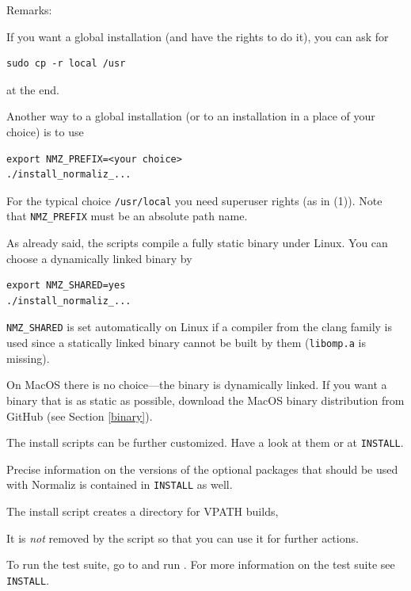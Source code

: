 Remarks:
\begin{arab}

\item If you want a global installation (and have the rights to do it), you can ask for
\begin{Verbatim}
sudo cp -r local /usr
\end{Verbatim}
at the end.

\item Another way to a global installation (or to an installation in a place of your choice) is to use
\begin{Verbatim}
export NMZ_PREFIX=<your choice>  
./install_normaliz_...
\end{Verbatim}

For the typical choice \verb|/usr/local| you need superuser rights (as in (1)). Note that \verb|NMZ_PREFIX| must be an absolute path name.

\item As already said, the scripts compile a fully static binary under Linux. You can choose a dynamically linked binary by
\begin{Verbatim}
export NMZ_SHARED=yes
./install_normaliz_...
\end{Verbatim}
\verb|NMZ_SHARED| is set automatically on Linux if a compiler from the clang family is used since a statically linked binary cannot be built by them (\verb|libomp.a| is missing).

On MacOS there is no choice---the binary is dynamically linked. If you want a binary that is as static as possible, download the MacOS binary distribution from GitHub (see Section \ref{binary}).

\item The install scripts can be further customized. Have a look at them or at \verb|INSTALL|.

\item Precise information on the versions of the optional packages that should be used with Normaliz \version{} is contained in \verb|INSTALL| as well.

\item The install script creates a directory for VPATH builds,
\begin{center}
\end{center}
It is \emph{not} removed by the script so that you can use it for further  actions.

\item To run the test suite, go to  and run . For more information on the test suite see \verb|INSTALL|.
\end{arab}

